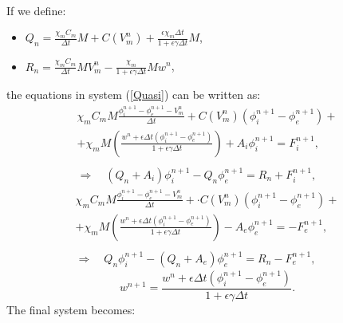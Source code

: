 \documentclass[a4paper,11pt]{article}
\begin{document}
\vspace{2mm} \\
If we define:
\begin{itemize}
\item $Q_n = \frac{\chi_m C_m}{\Delta t}M + C(V_m^n) + \frac{\epsilon\chi_m \Delta t}{1 + \epsilon \gamma \Delta t} M$,
\item $R_n = \frac{\chi_mC_m}{\Delta t}MV_m^n - \frac{\chi_m}{1+\epsilon\gamma\Delta t}M w^n$,
\end{itemize}
\vspace{4mm}
the equations in system (\ref{Quasi}) can be written as:
\begin{equation}
\begin{gathered}
\chi_m C_m M \frac{	\phi_i^{n+1}-\phi_e^{n+1}-V_m^{n}}{\Delta t} +  C(V_m^n) (\phi_i^{n+1}-\phi_e^{n+1}) + \\
 +\chi_m M \left(\frac{w^n + \epsilon \Delta t (\phi_i^{n+1}-\phi_e^{n+1})}{1+\epsilon \gamma \Delta t}   \right)
+ A_i \phi_i ^{n+1} = F_i^{n+1}, \\ \\
\Rightarrow \quad (Q_n + A_i) \phi_i^{n+1} - Q_n \phi_e^{n+1} =R_n +  F_i^{n+1},
\end{gathered}
\end{equation}
\vspace{3mm}
\begin{equation}
\begin{gathered}
\chi_m C_m M \frac{	\phi_i^{n+1}-\phi_e^{n+1}-V_m^{n}}{\Delta t} + \cdot C(V_m^n) (\phi_i^{n+1}-\phi_e^{n+1}) +\\ 
+ \chi_m M \left(\frac{w^n + \epsilon \Delta t (\phi_i^{n+1}-\phi_e^{n+1})}{1+\epsilon \gamma \Delta t}   \right)
- A_e \phi_e ^{n+1} = -F_e^{n+1}, \\ \\
\Rightarrow \quad Q_n \phi_i^{n+1} - (Q_n+A_e) \phi_e^{n+1} =R_n - F_e^{n+1},
\end{gathered}
\end{equation}
\vspace{3mm}
\begin{equation}
w^{n+1} = \frac{w^n + \epsilon \Delta t (\phi_i^{n+1}-\phi_e^{n+1})}{1+\epsilon \gamma \Delta t}.
\end{equation}
The final system becomes: \\
\end{document}
